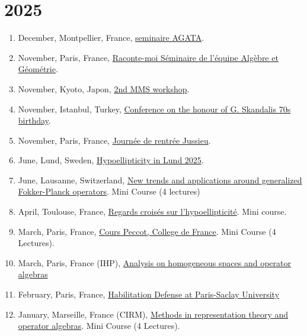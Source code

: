 \documentclass[a4paper, 13pt]{article}
\begin{document}
\section*{2025}
  \begin{enumerate}
    \item December, Montpellier, France, \href{}{seminaire AGATA}.
    \item November, Paris, France, \href{https://www.math.ens.psl.eu/~tholozan/raconte_moi.html}{Raconte-moi Séminaire de l'équipe Algèbre et Géométrie}.
    \item November, Kyoto, Japon, \href{}{2nd MMS workshop}.
    \item November, Istanbul, Turkey, \href{https://sites.google.com/sheffield.ac.uk/correspondences/home?authuser=0}{Conference on the honour of G. Skandalis 70s birthday}.
    \item November, Paris, France, \href{}{Journée de rentrée Jussieu}.
    \item June, Lund, Sweden, \href{https://www.maths.lu.se/english/research/seminars/hypoellipticity-in-lund-2025/}{Hypoellipticity in Lund 2025}.
    \item June, Lausanne, Switzerland, \href{https://bernoulli.epfl.ch/programs/new-trends-and-applications-around-generalized-fokker-planck-operators/}{New trends and applications around generalized Fokker-Planck operators}. Mini Course (4 lectures)
    \item April, Toulouse, France, \href{https://indico.math.cnrs.fr/event/13702/overview}{Regards croisés sur l'hypoellipticité}. Mini course.
    \item March, Paris, France, \href{https://www.college-de-france.fr/fr/agenda/conferencier-invite/on-maximal-hypoellipticity-and-sub-riemannian-geometry}{Cours Peccot, College de France}. Mini Course (4 Lectures).
    \item March, Paris, France (IHP), \href{https://indico.math.cnrs.fr/event/10858/}{Analysis on homogeneous spaces and operator algebras}
    \item February, Paris, France, \href{https://www.imo.universite-paris-saclay.fr/en/events/7558}{Habilitation Defense at Paris-Saclay University}
    \item January,  Marseille, France (CIRM), \href{https://conferences.cirm-math.fr/3227.html}{Methods in representation theory and operator algebras}. Mini Course (4 Lectures).
  \end{enumerate}
\end{document}
